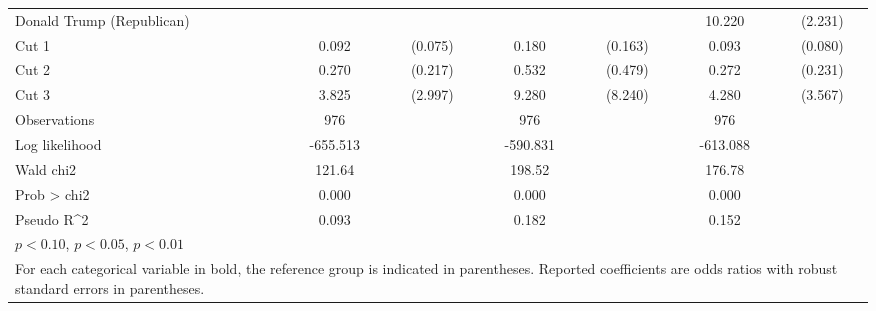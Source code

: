 \begin{table}[htbp]
\begin{tabular}{l*{3}{cc}}
Donald Trump (Republican)&                     &            &                     &            &      10.220\sym{***}&     (2.231)\\
Cut 1               &       0.092\sym{***}&     (0.075)&       0.180\sym{*}  &     (0.163)&       0.093\sym{***}&     (0.080)\\
Cut 2               &       0.270         &     (0.217)&       0.532         &     (0.479)&       0.272         &     (0.231)\\
Cut 3               &       3.825\sym{*}  &     (2.997)&       9.280\sym{**} &     (8.240)&       4.280\sym{*}  &     (3.567)\\
\hline
Observations        &         976         &            &         976         &            &         976         &            \\
Log likelihood      &    -655.513         &            &    -590.831         &            &    -613.088         &            \\
Wald chi2           &      121.64         &            &      198.52         &            &      176.78         &            \\
Prob > chi2         &       0.000         &            &       0.000         &            &       0.000         &            \\
Pseudo R^2          &       0.093         &            &       0.182         &            &       0.152         &            \\
\hline\hline
\multicolumn{7}{l}{\footnotesize \sym{*} \(p<0.10\), \sym{**} \(p<0.05\), \sym{***} \(p<0.01\)}\\
\multicolumn{7}{p{0.9\linewidth}}{\footnotesize 
For each categorical variable in bold, the reference group is indicated in parentheses. 
Reported coefficients are odds ratios with robust standard errors in parentheses.} \\

\end{tabular}
\end{table}
